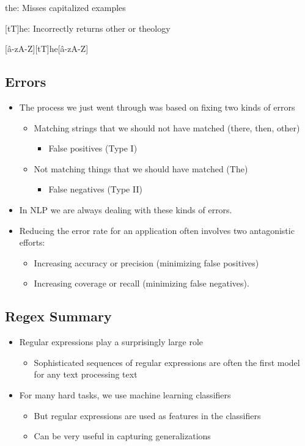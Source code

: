 \documentclass[11pt]{article}
\theoremstyle{definition}
\begin{document}
the: Misses capitalized examples

[tT]he: Incorrectly returns other or theology

[\^a-zA-Z][tT]he[\^a-zA-Z]

\subsection{Errors}
\begin{itemize}
  \item The process we just went through was based on fixing
  two kinds of errors
  \begin{itemize}
    \item Matching strings that we should not have matched (there,
    then, other)
    \begin{itemize}
      \item False positives (Type I)
    \end{itemize}
    \item Not matching things that we should have matched (The)
    \begin{itemize}
      \item False negatives (Type II)
    \end{itemize}
  \end{itemize}
  \item In NLP we are always dealing with these kinds of
  errors.
  \item Reducing the error rate for an application often
  involves two antagonistic efforts:
  \begin{itemize}
    \item Increasing accuracy or precision (minimizing false positives)
    \item Increasing coverage or recall (minimizing false negatives).
  \end{itemize}
\end{itemize}

\subsection{Regex Summary}
\begin{itemize}
  \item Regular expressions play a surprisingly large role
  \begin{itemize}
    \item Sophisticated sequences of regular expressions are often the first model
    for any text processing text
  \end{itemize}
\end{itemize}
\begin{itemize}
  \item For many hard tasks, we use machine learning classifiers
  \begin{itemize}
    \item But regular expressions are used as features in the classifiers
    \item Can be very useful in capturing generalizations
  \end{itemize}
\end{itemize}
\end{document}
